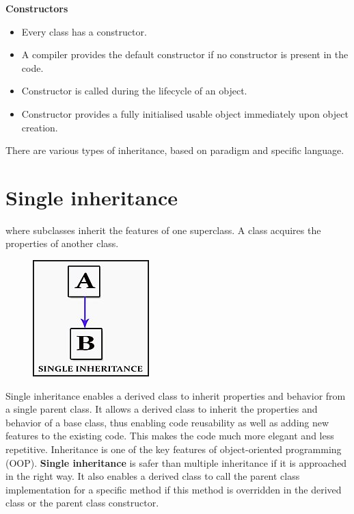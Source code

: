 \documentclass[
	12pt, %
]{fphw}
\begin{document}
\textbf{Constructors} \\

\begin{itemize}
\item Every class has a constructor.
\item A compiler provides the default constructor if no constructor is present in the code.
\item Constructor is called during the lifecycle of an object.
\item Constructor provides a fully initialised usable object immediately upon object creation.
  
\end{itemize}

\newpage

There are various types of inheritance, based on paradigm and specific language.

\section*{{\color{Cerulean}Single inheritance}}
where subclasses inherit the features of one superclass. A class acquires the properties of another class.

\begin{figure}[H]
  \centering
  \includegraphics[scale=0.6]{images/170px-Single_Inheritance.jpg}
\end{figure}

Single inheritance enables a derived class to inherit properties and behavior from a single parent class. It allows a derived class to inherit the properties and behavior of a base class, thus enabling code reusability as well as adding new features to the existing code. This makes the code much more elegant and less repetitive. Inheritance is one of the key features of object-oriented programming (OOP). \textbf{Single inheritance} is safer than multiple inheritance if it is approached in the right way. It also enables a derived class to call the parent class implementation for a specific method if this method is overridden in the derived class or the parent class constructor.
\end{document}
